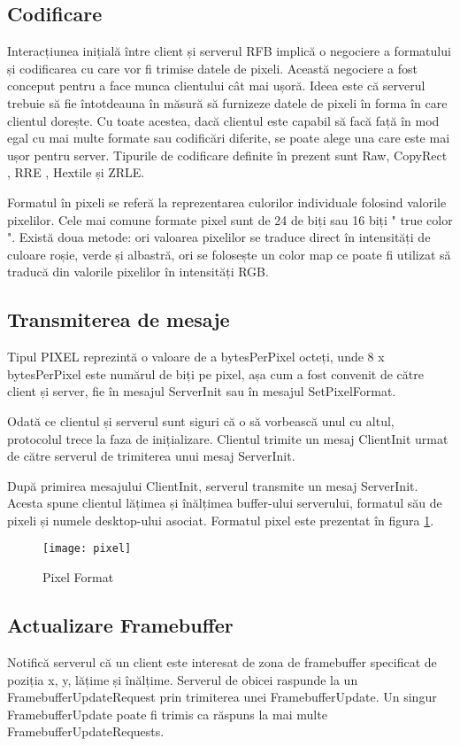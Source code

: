 \subsection{Codificare}
Interacțiunea inițială între client și serverul RFB implică o negociere a formatului și codificarea cu care vor fi trimise datele de pixeli. Această negociere a fost conceput pentru a face munca clientului cât mai ușoră. Ideea este că serverul trebuie să fie întotdeauna în măsură să furnizeze datele de pixeli în forma în care clientul dorește. Cu toate acestea, dacă clientul este capabil să facă față în mod egal cu mai multe formate sau codificări diferite, se poate alege una care este mai ușor pentru server. Tipurile de codificare definite în prezent sunt Raw, CopyRect , RRE , Hextile și ZRLE.

Formatul în pixeli se referă la reprezentarea culorilor individuale folosind valorile pixelilor. Cele mai comune formate pixel sunt de 24 de biți sau 16 biți " true color ". Există doua metode: ori valoarea pixelilor se traduce direct în intensități de culoare roșie, verde și albastră, ori se folosește un color map ce poate fi utilizat să traducă din valorile pixelilor în intensități RGB.

\subsection{Transmiterea de mesaje}
Tipul PIXEL reprezintă o valoare de a bytesPerPixel octeți, unde 8 x bytesPerPixel este numărul de biți pe pixel, așa cum a fost convenit de către client și server, fie în mesajul ServerInit sau în mesajul SetPixelFormat.

Odată ce clientul și serverul sunt siguri că o să vorbească unul cu altul, protocolul trece la faza de inițializare. Clientul trimite un mesaj ClientInit urmat de către serverul de trimiterea unui mesaj ServerInit.

După primirea mesajului ClientInit, serverul transmite un mesaj ServerInit. Acesta spune clientul lățimea și înălțimea buffer-ului serverului, formatul său de pixeli și numele desktop-ului asociat. Formatul pixel este prezentat în figura \ref{pixell}.

\begin{figure}
    \centering
    \texttt{[image: pixel]}
    \caption{Pixel Format}
    \label{pixell}
\end{figure}

\subsection{Actualizare Framebuffer}
Notifică serverul că un client este interesat de zona de framebuffer specificat de  poziția x, y, lățime și înălțime. Serverul de obicei raspunde la un FramebufferUpdateRequest prin trimiterea unei FramebufferUpdate. Un singur FramebufferUpdate poate fi trimis ca răspuns la mai multe FramebufferUpdateRequests.

